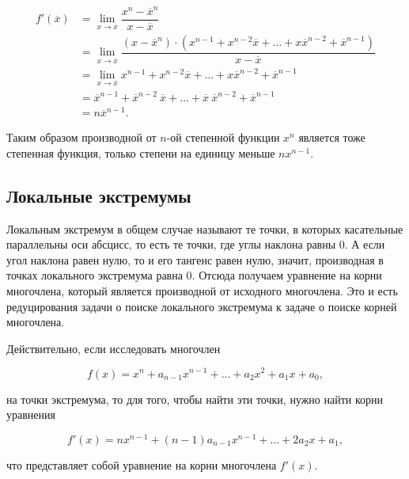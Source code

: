 \documentclass[12pt]{article}
\begin{document}
\begin{equation}\label{eq:69}
\begin{split}
	f'(\overline{x}) &= \lim_{x\rightarrow\overline{x}}\dfrac{x^n - \overline{x}^n}{x - \overline{x}}\\
	&= \lim_{x\rightarrow\overline{x}} \dfrac{(x-\overline{x}^n)\cdot(x^{n-1} + x^{n-2}\overline{x} + \ldots + x\overline{x}^{n-2} + \overline{x}^{n-1})}{x - \overline{x}}\\
	&= \lim_{x\rightarrow\overline{x}} x^{n-1} + x^{n-2}\overline{x} + \ldots + x\overline{x}^{n-2} + \overline{x}^{n-1}\\
	&= \overline{x}^{n-1} + \overline{x}^{n-2}\ \overline{x} + \ldots + \overline{x}\ \overline{x}^{n-2} + \overline{x}^{n-1}\\
	&= n \overline{x}^{n-1}.
\end{split}
\end{equation}

Таким образом производной от $n$\--ой степенной функции $x^n$ является тоже степенная функция, только степени на единицу меньше $nx^{n-1}$.

\subsection{Локальные экстремумы}
Локальным экстремум в общем случае называют те точки, в которых касательные параллельны оси абсцисс, то есть те точки, где углы наклона равны $0$. А если угол наклона равен нулю, то и его тангенс равен нулю, значит, производная в точках локального экстремума равна $0$. Отсюда получаем уравнение на корни многочлена, который является производной от исходного многочлена. Это и есть редуцирования задачи о поиске локального экстремума к задаче о поиске корней многочлена.

\par
Действительно, если исследовать многочлен

\begin{equation}
	f(x) = x^n + a_{n-1}x^{n-1} + \ldots + a_2 x^2 + a_1 x + a_0,
\end{equation}

на точки экстремума, то для того, чтобы найти эти точки, нужно найти корни уравнения

\begin{equation}
	f'(x) = n x^{n-1} + (n-1)a_{n-1}x^{n-1} + \ldots + 2 a_2 x + a_1,
\end{equation}

что представляет собой уравнение на корни многочлена $f'(x)$.
\end{document}
